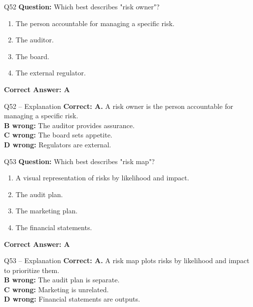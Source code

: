 \documentclass[aspectratio=169,10pt]{beamer}
\begin{document}
	\begin{frame}[t]{Q52}
		\small
		\textbf{Question:} Which best describes "risk owner"?
		\begin{enumerate}[label=\Alph*.,itemsep=1pt,topsep=2pt]
			\item The person accountable for managing a specific risk.
			\item The auditor.
			\item The board.
			\item The external regulator.
		\end{enumerate}
		\vspace{4pt}
		\textbf{Correct Answer: A}
	\end{frame}
	
	\begin{frame}[t]{Q52 -- Explanation}
		\small
		\textbf{Correct: A.} A risk owner is the person accountable for managing a specific risk. \\[4pt]
		\textbf{B wrong:} The auditor provides assurance. \\[2pt]
		\textbf{C wrong:} The board sets appetite. \\[2pt]
		\textbf{D wrong:} Regulators are external.
	\end{frame}
	
	\begin{frame}[t]{Q53}
		\small
		\textbf{Question:} Which best describes "risk map"?
		\begin{enumerate}[label=\Alph*.,itemsep=1pt,topsep=2pt]
			\item A visual representation of risks by likelihood and impact.
			\item The audit plan.
			\item The marketing plan.
			\item The financial statements.
		\end{enumerate}
		\vspace{4pt}
		\textbf{Correct Answer: A}
	\end{frame}
	
	\begin{frame}[t]{Q53 -- Explanation}
		\small
		\textbf{Correct: A.} A risk map plots risks by likelihood and impact to prioritize them. \\[4pt]
		\textbf{B wrong:} The audit plan is separate. \\[2pt]
		\textbf{C wrong:} Marketing is unrelated. \\[2pt]
		\textbf{D wrong:} Financial statements are outputs.
	\end{frame}
	
\end{document}
